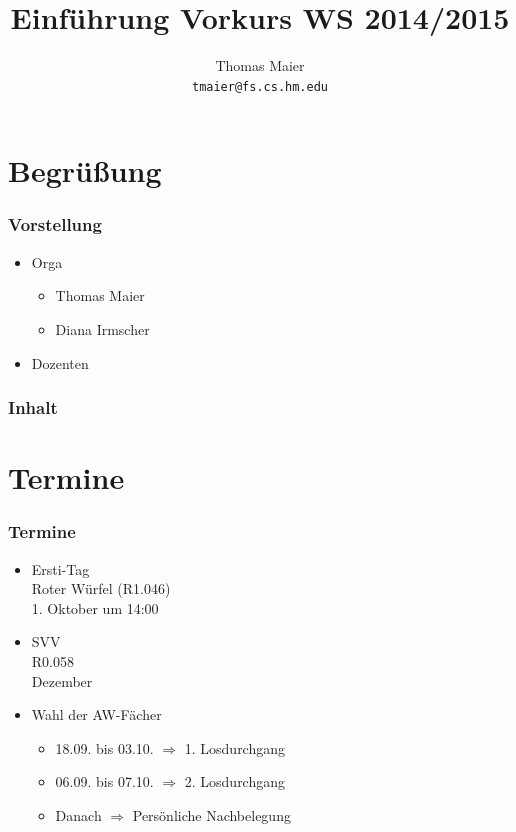 \documentclass{beamer}
\begin{document}
\title{Einführung Vorkurs WS 2014/2015}
\author[Thomas Maier]{Thomas Maier\\\texttt{tmaier@fs.cs.hm.edu}}


\frame{\titlepage}



\section*{Begrüßung}
\begin{frame}
\frametitle{Vorstellung}
\begin{itemize}
	\item Orga
		\begin{itemize}
			\item Thomas Maier
			\item Diana Irmscher
		\end{itemize}
	\item Dozenten
\end{itemize}
\end{frame}

\begin{frame}
\frametitle{Inhalt}
\tableofcontents
\end{frame}


\section{Termine}
\begin{frame}
\frametitle{Termine}
\begin{itemize}
	\item Ersti-Tag\\Roter Würfel (R1.046)\\1. Oktober um 14:00
	\pause
	\item SVV\\R0.058\\Dezember
	\pause
	\item Wahl der AW-Fächer
	\pause
		\begin{itemize}
			\item 18.09. bis 03.10. $\Rightarrow$ 1. Losdurchgang
			\item 06.09. bis 07.10. $\Rightarrow$ 2. Losdurchgang
			\item Danach $\Rightarrow$ Persönliche Nachbelegung
		\end{itemize}
\end{itemize}
\end{frame}
\end{document}
